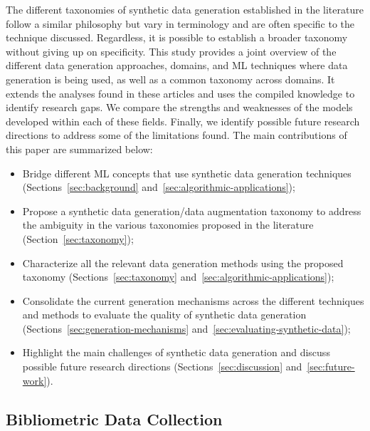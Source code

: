 The different taxonomies of synthetic data generation established in the
literature follow a similar philosophy but vary in terminology and are often
specific to the technique discussed. Regardless, it is possible to establish a
broader taxonomy without giving up on specificity. This study provides a joint
overview of the different data generation approaches, domains, and ML
techniques where data generation is being used, as well as a common taxonomy
across domains. It extends the analyses found in these articles and uses the
compiled knowledge to identify research gaps. We compare the strengths and
weaknesses of the models developed within each of these fields. Finally, we
identify possible future research directions to address some of the
limitations found. The main contributions of this paper are summarized below:

\begin{itemize}

    \item Bridge different ML concepts that use synthetic data generation
        techniques (Sections~\ref{sec:background}
        and~\ref{sec:algorithmic-applications});

    \item Propose a synthetic data generation/data augmentation taxonomy to
        address the ambiguity in the various taxonomies proposed in the
        literature (Section~\ref{sec:taxonomy});

    \item Characterize all the relevant data generation methods using the
        proposed taxonomy (Sections~\ref{sec:taxonomy}
        and~\ref{sec:algorithmic-applications});

    \item Consolidate the current generation mechanisms across the
        different techniques and methods to evaluate the quality of
        synthetic data generation (Sections~\ref{sec:generation-mechanisms}
        and~\ref{sec:evaluating-synthetic-data});

    \item Highlight the main challenges of synthetic data generation and
        discuss possible future research directions
        (Sections~\ref{sec:discussion} and~\ref{sec:future-work}).

\end{itemize}

\subsection{Bibliometric Data Collection}

